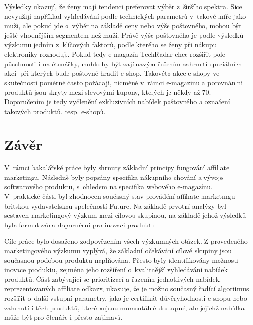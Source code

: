 \documentclass[12pt,oneside,openany]{fithesis}
\makeatletter
\def\cleardoublepage{\clearpage\if@twoside \ifodd\c@page\else
        \thispagestyle{empty}
        \hbox{}\newpage\if@twocolumn\hbox{}\newpage\fi\fi\fi}
\makeatother
\begin{document}
                          Výsledky ukazují, že ženy mají tendenci 
preferovat výběr z~širšího spektra. Sice nevyužijí například 
vyhledávání podle technických parametrů v~takové míře jako muži, ale 
pokud jde o~výběr na základě ceny nebo výše poštovného, mohou být 
ještě vhodnějším segmentem než muži. Právě výše poštovného je 
podle výsledků výzkumu jedním z~klíčových faktorů, podle kterého se 
ženy při nákupu elektroniky rozhodují. Pokud tedy e-magazín TechRadar chce 
rozšířit pole působnosti i na čtenářky, mohlo by být zajímavým 
řešením zahrnutí speciálních akcí, při kterých bude poštovné hradit 
e-shop. Takovéto akce e-shopy ve skutečnosti poměrně často pořádají, 
nicméně v~rámci e-magazínu a porovnáníní produktů jsou skryty mezi 
slevovými kupony, kterých je někdy až 70. Doporučením je tedy 
vyčlenění exkluzivních nabídek poštovného a označení takových 
produktů, resp. e-shopů.

\newpage\null\thispagestyle{empty}\newpage

\cleardoublepage
{}
{}
\chapter*{Závěr}
\markright{\contentsname}



                          V~rámci bakalářské práce byly shrnuty základní 
principy fungování affiliate marketingu. Následně byly popsány specifika 
nákupního chování a vývoje softwarového produktu, s~ohledem na specifika 
webového e-magazínu. V~praktické části byl zhodnocen současný stav 
provádění affiliate marketingu britskou vydavatelskou společností Future. 
Na základě prvotní analýzy byl sestaven marketingový výzkum mezi cílovou 
skupinou, na základě jehož výsledků byla formulována doporučení pro 
inovaci produktu.

Cíle práce bylo dosaženo zodpovězením všech výzkumných otázek. Z provedeného marketingového
výzkumu vyplývá, že základní očekávání 
cílové skupiny jsou současnou podobou produktu naplňována. Přesto byly 
identifikovány možnosti inovace produktu, zejména jeho rozšíření 
o~kvalitnější vyhledávání nabídek produktů. Část zabývající se 
prioritizací a řazením jednotlivých nabídek, reprezentovaných affiliate 
odkazy, ukazuje, že je možno současný řadící algoritmus rozšířit 
o~další vstupní parametry, jako je certifikát důvěryhodnosti e-shopu nebo 
zahrnutí i těch produktů, které nejsou momentálně dostupné, ale jejichž 
nabídka může být pro čtenáře i přesto zajímavá.
\end{document}
